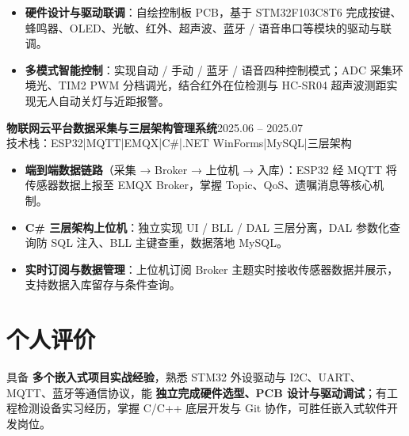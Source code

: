 \documentclass[10pt,a4paper]{article}
\newcommand{\projectblock}[3]{%
    {\bfseries\color{darktext}#1}\hfill{\color{graytext}#2}\\%
    {\small\color{graytext}#3}%
    \vspace{0.2em}%
}
\begin{document}
\begin{itemize}[leftmargin=1.5em, itemsep=2pt, parsep=0pt, topsep=2pt]
    \item \textbf{硬件设计与驱动联调}：自绘控制板 PCB，基于 STM32F103C8T6 完成按键、蜂鸣器、OLED、光敏、红外、超声波、蓝牙 / 语音串口等模块的驱动与联调。
    \item \textbf{多模式智能控制}：实现自动 / 手动 / 蓝牙 / 语音四种控制模式；ADC 采集环境光、TIM2 PWM 分档调光，结合红外在位检测与 HC-SR04 超声波测距实现无人自动关灯与近距报警。
\end{itemize}

\vspace{0.12em}

\projectblock{物联网云平台数据采集与三层架构管理系统}{2025.06 -- 2025.07}{技术栈：ESP32\hspace{0.3em}|\hspace{0.3em}MQTT\hspace{0.3em}|\hspace{0.3em}EMQX\hspace{0.3em}|\hspace{0.3em}C\#\hspace{0.3em}|\hspace{0.3em}.NET WinForms\hspace{0.3em}|\hspace{0.3em}MySQL\hspace{0.3em}|\hspace{0.3em}三层架构}

\begin{itemize}[leftmargin=1.5em, itemsep=2pt, parsep=0pt, topsep=2pt]
    \item \textbf{端到端数据链路}（采集 → Broker → 上位机 → 入库）：ESP32 经 MQTT 将传感器数据上报至 EMQX Broker，掌握 Topic、QoS、遗嘱消息等核心机制。
    \item \textbf{C\# 三层架构上位机}：独立实现 UI / BLL / DAL 三层分离，DAL 参数化查询防 SQL 注入、BLL 主键查重，数据落地 MySQL。
    \item \textbf{实时订阅与数据管理}：上位机订阅 Broker 主题实时接收传感器数据并展示，支持数据入库留存与条件查询。
\end{itemize}

\vspace{0.12em}

\section{\faUser\hspace{0.4em}个人评价}

具备 \textbf{多个嵌入式项目实战经验}，熟悉 STM32 外设驱动与 I2C、UART、MQTT、蓝牙等通信协议，能 \textbf{独立完成硬件选型、PCB 设计与驱动调试}；有工程检测设备实习经历，掌握 C/C++ 底层开发与 Git 协作，可胜任嵌入式软件开发岗位。
\end{document}
